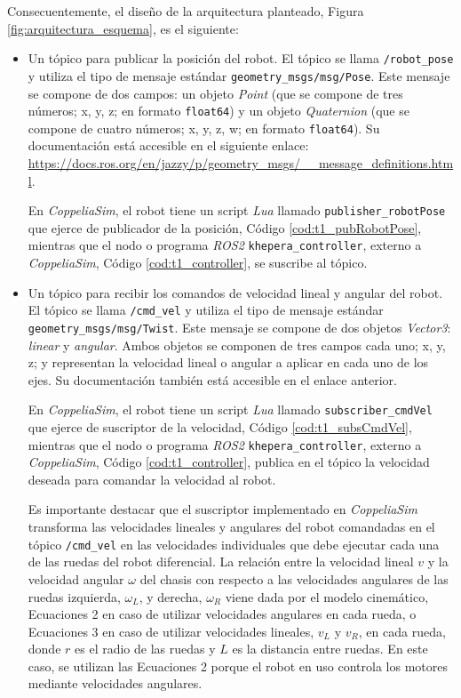 Consecuentemente, el diseño de la arquitectura planteado, Figura \ref{fig:arquitectura_esquema},
es el siguiente:
\begin{itemize}
    \item Un tópico para publicar la posición del robot. El tópico se llama 
    \texttt{/robot\_pose} y utiliza el tipo de mensaje estándar \texttt{geometry\_msgs/msg/Pose}.
    Este mensaje se compone de dos campos: un objeto \textit{Point} (que se compone de 
    tres números; x, y, z; en formato \texttt{float64}) y un objeto 
    \textit{Quaternion} (que se compone de 
    cuatro números; x, y, z, w; en formato \texttt{float64}). Su documentación 
    está accesible en el siguiente enlace:
    \url{https://docs.ros.org/en/jazzy/p/geometry_msgs/__message_definitions.html}.

    En \textit{CoppeliaSim}, el robot tiene un script \textit{Lua} llamado \texttt{publisher\_robotPose}
    que ejerce de publicador de la posición, Código \ref{cod:t1_pubRobotPose}, mientras 
    que el nodo o programa \textit{ROS2} 
    \texttt{khepera\_controller}, externo a \textit{CoppeliaSim}, Código \ref{cod:t1_controller},
    se suscribe al tópico.

    \item Un tópico para recibir los comandos de velocidad lineal y angular 
    del robot. El tópico se llama 
    \texttt{/cmd\_vel} y utiliza el tipo de mensaje estándar \texttt{geometry\_msgs/msg/Twist}.
    Este mensaje se compone de dos objetos \textit{Vector3}: \textit{linear} y \textit{angular}. 
    Ambos objetos se componen de tres campos cada uno; x, y, z; y representan la velocidad 
    lineal o angular a aplicar en cada uno de los ejes. Su documentación 
    también está accesible en el enlace anterior.

    En \textit{CoppeliaSim}, el robot tiene un script \textit{Lua} llamado \texttt{subscriber\_cmdVel}
    que ejerce de suscriptor de la velocidad, Código \ref{cod:t1_subsCmdVel}, mientras que el nodo o programa 
    \textit{ROS2} \texttt{khepera\_controller}, externo a \textit{CoppeliaSim}, Código \ref{cod:t1_controller},
    publica en el tópico la velocidad deseada para comandar la velocidad al robot.

    Es importante destacar que el suscriptor implementado en \textit{CoppeliaSim}
    transforma las velocidades lineales y angulares del robot comandadas en el tópico 
    \texttt{/cmd\_vel} en las velocidades individuales que debe ejecutar cada una 
    de las ruedas del robot diferencial. La relación entre la velocidad 
    lineal \(v\) y la velocidad angular \(\omega\) del chasis con respecto a las 
    velocidades angulares de las ruedas izquierda, \(\omega_L\), y derecha, \(\omega_R\)
    viene dada por el modelo cinemático, Ecuaciones 2 en caso de utilizar velocidades
    angulares en cada rueda, o Ecuaciones 3 en caso de utilizar velocidades lineales,
    \(v_L\) y \(v_R\), en cada rueda, donde \(r\) es el radio de las ruedas y
    \(L\) es la distancia entre ruedas. En este caso, se utilizan las Ecuaciones 2 porque
    el robot en uso controla los motores mediante velocidades angulares.


\end{itemize}
